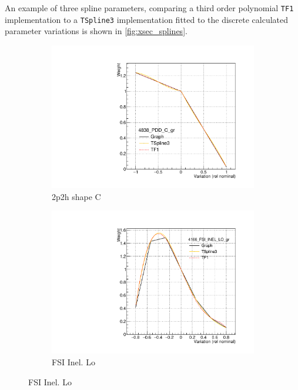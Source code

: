 An example of three spline parameters, comparing a third order polynomial \texttt{TF1} implementation to a \texttt{TSpline3} implementation fitted to the discrete calculated parameter variations is shown in \autoref{fig:xsec_splines}.
\begin{figure}[h]
	\centering
	\begin{subfigure}[t]{0.32\textwidth}
		\includegraphics[width=\textwidth, trim={5mm 5mm 15mm 15mm}, clip,page=1]{figures/niwg/splines/pdd_c}
		\caption{2p2h shape C}
	\end{subfigure}
	\begin{subfigure}[t]{0.32\textwidth}
		\includegraphics[width=\textwidth, trim={5mm 5mm 15mm 15mm}, clip,page=1]{figures/niwg/splines/fsi_inel_lo}
		\caption{FSI Inel. Lo}
	\end{subfigure}	

\end{figure}
